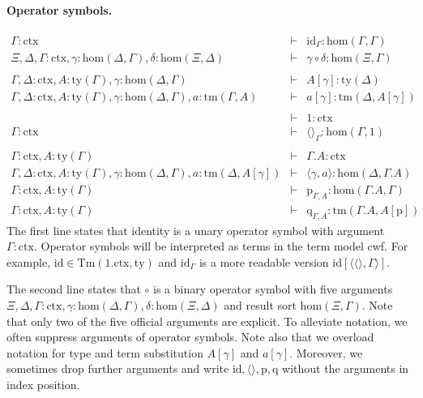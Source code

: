 \documentclass[11pt,a4paper]{article}
\theoremstyle{plain}
\theoremstyle{definition}
\newcommand{\id}{\mathsf{id}}
\newcommand{\Tm}{\mathrm{Tm}}
\def\sub{\mathrm{hom}}
\def\id{\mathrm{id}}
\newcommand{\ctx}{\mathrm{ctx}}
\newcommand{\ty}{\mathrm{ty}}
\newcommand{\tm}{\mathrm{tm}}
\newcommand{\tuple}[1]{\langle #1 \rangle}
\newcommand{\cext}{.}
\def\p{\mathrm{p}}
\def\q{\mathrm{q}}
\begin{document}
\paragraph{Operator symbols.}
\begin{eqnarray*}
\Gamma : \ctx &\vdash& \id_{\Gamma} : \sub(\Gamma,\Gamma)\\
\Xi,\Delta,\Gamma : \ctx, \gamma : \sub(\Delta,\Gamma), \delta : \sub(\Xi,\Delta) &\vdash&
\gamma \circ \delta : \sub(\Xi,\Gamma)\\
\\
\Gamma,\Delta : \ctx, A:\ty(\Gamma), \gamma : \sub(\Delta,\Gamma) &\vdash&
A[\gamma] : \ty(\Delta)\\
\Gamma,\Delta : \ctx, A:\ty(\Gamma), \gamma : \sub(\Delta,\Gamma), a:\tm(\Gamma,A) &\vdash&  a[\gamma] : \tm(\Delta,A[\gamma])\\
\\
&\vdash& 1 : \ctx\\
\Gamma : \ctx &\vdash& \tuple{}_\Gamma : \sub(\Gamma,1)\\
\\
\Gamma : \ctx, A:\ty(\Gamma) &\vdash& \Gamma\cext A : \ctx\\
\Gamma,\Delta : \ctx, A:\ty(\Gamma), \gamma : \sub(\Delta,\Gamma), a:\tm(\Delta,A[\gamma]) &\vdash& \tuple{\gamma,a} : \sub(\Delta,\Gamma\cext A)\\
\Gamma : \ctx, A:\ty(\Gamma) &\vdash& \p_{\Gamma,A}: \sub(\Gamma\cext A,\Gamma)\\
\Gamma : \ctx, A:\ty(\Gamma) &\vdash& \q_{\Gamma,A}: \tm(\Gamma\cext A,A[\p])
\end{eqnarray*}
The first line states that identity is a unary operator symbol with argument $\Gamma : \ctx$.
Operator symbols will be interpreted as terms in the term model cwf. For example, $\id \in \Tm(1.\ctx,\ty)$ and $\id_\Gamma$ is a more readable version $\id[\tuple{\tuple{},\Gamma}]$. 

 The second line states that $\circ$ is a binary operator symbol with five arguments $\Xi,\Delta,\Gamma : \ctx, \gamma : \sub(\Delta,\Gamma), \delta : \sub(\Xi,\Delta)$ and result sort $\sub(\Xi,\Gamma)$. Note that only two of the five official arguments are explicit. To alleviate notation, we often suppress arguments of operator symbols. Note also that we overload notation for type and term substitution $A[\gamma]$ and $a[\gamma]$. Moreover, we sometimes drop further arguments and write $\id, \tuple{},\p,\q$ without the arguments in index position.
\end{document}
